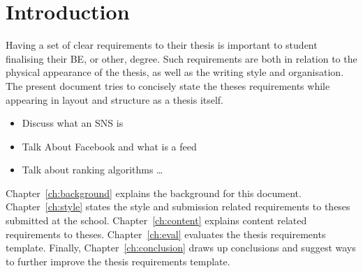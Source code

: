 \chapter{Introduction}\label{ch:intro}

Having a set of clear requirements to their thesis is important to student
finalising their BE, or other, degree.  Such requirements are both in
relation to the physical appearance of the thesis, as well as the writing
style and organisation.  The present document tries to concisely state the
theses requirements while appearing in layout and structure as a thesis
itself.

\begin{itemize}
  \item Discuss what an SNS is
  \item Talk About Facebook and what is a feed
  \item Talk about ranking algorithms
\ldots
\end{itemize}

Chapter~\ref{ch:background} explains the background for this document.
Chapter~\ref{ch:style} states the style and submission related requirements
to theses submitted at the school.
Chapter~\ref{ch:content} explains content related requirements to theses.
Chapter~\ref{ch:eval} evaluates the thesis requirements template.  Finally,
Chapter~\ref{ch:conclusion} draws up conclusions and suggest ways to
further improve the thesis requirements template.

